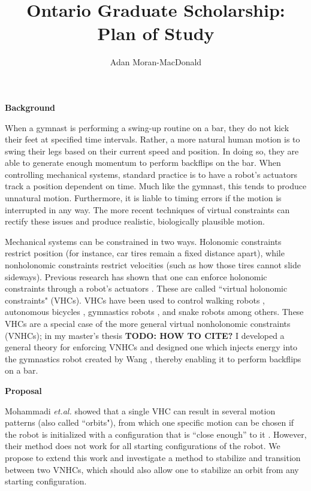 \documentclass[a4paper,12pt]{article}
\begin{document}
\title{Ontario Graduate Scholarship: Plan of Study}
\author{Adan Moran-MacDonald}
\date{}
\maketitle

\begin{large}
\textbf{Background}
\end{large}

When a gymnast is performing a swing-up routine on a bar, they do not kick their
feet at specified time intervals. Rather, a more natural human motion is to
swing their legs based on their current speed and position. In doing so, they
are able to generate enough momentum to perform backflips on the bar. When
controlling mechanical systems, standard practice is to have a robot's actuators
track a position dependent on time. Much like the gymnast, this tends to
produce unnatural motion. Furthermore, it is liable to timing errors if the
motion is interrupted in any way. The more recent techniques of virtual constraints 
can rectify these issues and produce realistic, biologically plausible motion.

Mechanical systems can be constrained in two ways. Holonomic constraints
restrict position (for instance, car tires remain a fixed distance apart), while
nonholonomic constraints restrict velocities (such as how those tires cannot
slide sideways). Previous research has shown that one can enforce holonomic
constraints through a robot's actuators \cite{vhcs_for_el_systems}. These are
called ``virtual holonomic constraints" (VHCs). VHCs have been used to control
walking robots \cite{stable-walking}, autonomous bicycles \cite{bicycle},
gymnastics robots \cite{xingbo-thesis}, and snake robots \cite{snake-robot}
among others. These VHCs are a special case of the more general virtual
nonholonomic constraints (VNHCs); in my master's thesis \textbf{TODO: HOW TO
CITE?} I developed a general theory for enforcing VNHCs and designed
one which injects energy into the gymnastics robot created by Wang
\cite{xingbo-thesis}, thereby enabling it to perform backflips on a bar.

\begin{large} \textbf{Proposal} \end{large}

Mohammadi \textit{et.al.} showed that a single VHC can result in several motion
patterns (also called ``orbits"), from which one specific motion can be chosen
if the robot is initialized with a configuration that is ``close enough” to it
\cite{manfredi-orbit-stabilization}. However, their method does not work for all
starting configurations of the robot. We propose to extend this work and 
investigate a method to stabilize and transition between two VNHCs, which should
also allow one to stabilize an orbit from any starting configuration.
\end{document}
